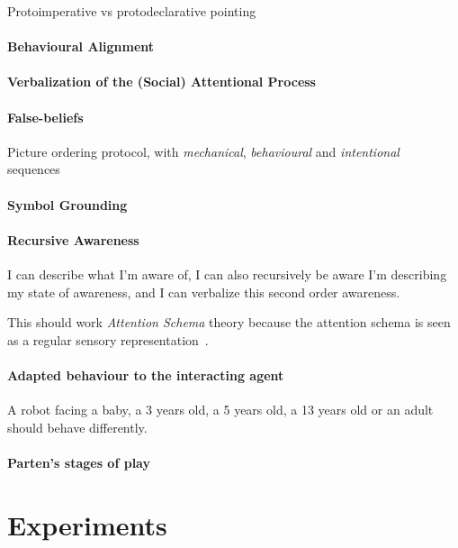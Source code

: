\documentclass[a4paper]{article}
\begin{document}
Protoimperative vs protodeclarative pointing~\cite{baron1986perceptual}

\paragraph{Behavioural Alignment}
\paragraph{Verbalization of the (Social) Attentional Process}
\paragraph{False-beliefs}


Picture ordering protocol, with \emph{mechanical}, \emph{behavioural} and
\emph{intentional} sequences~\cite{baron1986mechanical}

\paragraph{Symbol Grounding}

\paragraph{Recursive Awareness}

I can describe what I'm aware of, I can also recursively be aware I'm describing
my state of awareness, and I can verbalize this second order awareness.

This should work \emph{Attention Schema} theory because the attention schema
is seen as a regular sensory
representation~\citep[p.55]{graziano2013consciousness}.

\paragraph{Adapted behaviour to the interacting agent}

A robot facing a baby, a 3 years old, a 5 years old, a 13 years old or an adult
should behave differently.


\paragraph{Parten's stages of play}


\section{Experiments}
\end{document}
